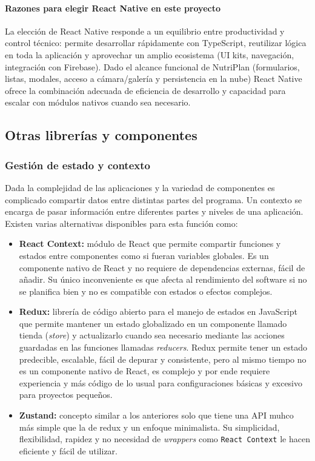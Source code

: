 \documentclass[twoside, openright, 11pt]{report}
\begin{document}
\begin{enumerate}
	\paragraph{Razones para elegir React Native en este proyecto}
	La elección de React Native responde a un equilibrio entre productividad y control técnico: permite desarrollar rápidamente con TypeScript, reutilizar lógica en toda la aplicación y aprovechar un amplio ecosistema (UI kits, navegación, integración con Firebase). Dado el alcance funcional de NutriPlan (formularios, listas, modales, acceso a cámara/galería y persistencia en la nube) React Native ofrece la combinación adecuada de eficiencia de desarrollo y capacidad para escalar con módulos nativos cuando sea necesario.

	\subsection{Otras librerías y componentes}
	
	
	\subsubsection*{Gestión de estado y contexto}
	Dada la complejidad de las aplicaciones y la variedad de componentes es complicado compartir datos entre distintas partes del programa. Un contexto se encarga de pasar información entre diferentes partes y niveles de una aplicación. Existen varias alternativas disponibles para esta función como:
	
	\begin{itemize}
		\item \textbf{React Context: } módulo de React que permite compartir funciones y estados entre componentes como si fueran variables globales. Es un componente nativo de React y no requiere de dependencias externas, fácil de añadir. Su único inconveniente es que afecta al rendimiento del software si no se planifica bien y no es compatible con estados o efectos complejos.
		\item \textbf{Redux: } librería de código abierto para el manejo de estados en JavaScript que permite mantener un estado globalizado en un componente llamado tienda (\textit{store}) y actualizarlo cuando sea necesario mediante las acciones guardadas en las funciones llamadas \textit{reducers}. Redux permite tener un estado predecible, escalable, fácil de depurar y consistente, pero al mismo tiempo no es un componente nativo de React, es complejo y por ende requiere experiencia y más código de lo usual para configuraciones básicas y excesivo para proyectos pequeños.
		\item \textbf{Zustand: } concepto similar a los anteriores solo que tiene una API muhco más simple que la de redux y un enfoque minimalista. Su simplicidad, flexibilidad, rapidez y no necesidad de \textit{wrappers} como \texttt{React Context} le hacen eficiente y fácil de utilizar.
	\end{itemize}


\end{enumerate}
\end{document}
